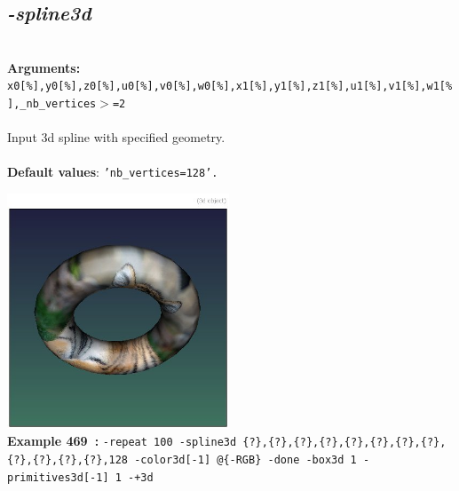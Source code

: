 \documentclass[a4paper,11pt,twoside]{book}
\begin{document}
\subsection{\emph{-spline3d} }\vspace*{-0.5em}
~\\\textbf{Arguments: } 
{\small \texttt{x0[\%],y0[\%],z0[\%],u0[\%],v0[\%],w0[\%],x1[\%],y1[\%],z1[\%],u1[\%],v1[\%],w1[\%],\_nb\_vertices$>$=2}}\\~\\
Input 3d spline with specified geometry.
~\\~\\\textbf{Default values}: {\small \texttt{'nb\_vertices=128'.}}
\begin{center}\includegraphics[keepaspectratio=true,height=7cm,width=\textwidth]{img/gmic_def469.jpg}\\
{\footnotesize \textbf{Example 469~:} \texttt{-repeat 100 -spline3d \{?\},\{?\},\{?\},\{?\},\{?\},\{?\},\{?\},\{?\},\{?\},\{?\},\{?\},\{?\},128 -color3d[-1] @\{-RGB\} -done -box3d 1 -primitives3d[-1] 1 -+3d}}
\end{center}
\end{document}
